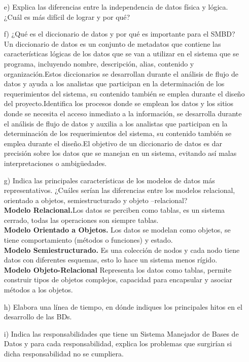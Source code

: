 \documentclass[a4paper, 12pt]{report}
\begin{document}
\begin{enumerate}
{\begin{enumerate}
\begin{itemize}
     \end{itemize}
    \item[e)]{Explica las diferencias entre la independencia de datos física y lógica. ¿Cuál es más difícil de lograr y por qué?  }
    \item[f)]{¿Qué es el diccionario de datos y por qué es importante para el SMBD?}\\
    Un diccionario de datos es un conjunto de metadatos que contiene las características lógicas de los datos que se van a utilizar en el sistema que se programa, incluyendo nombre, descripción, alias, contenido y organización.Estos diccionarios se desarrollan durante el análisis de flujo de datos y ayuda a los analistas que participan en la determinación de los requerimientos del sistema, su contenido también se emplea durante el diseño del proyecto.Identifica los procesos donde se emplean los datos y los sitios donde se necesita el acceso inmediato a la información, se desarrolla durante el análisis de flujo de datos y auxilia a los analistas que participan en la determinación de los requerimientos del sistema, su contenido también se emplea durante el diseño.El objetivo de un diccionario de datos es dar precisión sobre los datos que se manejan en un sistema, evitando así malas interpretaciones o ambigüedades.
    \item[g)]{Indica las principales características de los modelos de
    datos más representativos. ¿Cuáles serían las diferencias
    entre los  modelos relacional, orientado a objetos,
    semiestructurado y objeto –relacional?\\
    \textbf{Modelo Relacional.}Los datos se perciben como tablas,
    es un sistema cerrado, todas las operaciones son siempre tablas.\\
    \textbf{Modelo Orientado a Objetos.} Los datos se modelan como
    objetos, se tiene comportamiento (métodos o funciones) y estado.\\
    \textbf{Modelo Semiestructurado.} Es una colección de nodos y
    cada nodo tiene datos con diferentes esquemas, esto lo hace un
    sistema menos rígido.\\
    \textbf{Modelo Objeto-Relacional} Representa los datos como tablas,
    permite construir tipos de objetos complejos, capacidad para
    encapsular y asociar métodos a los objetos.}
    \item[h)]{Elabora una línea de tiempo, en dónde indiques los principales hitos en el desarrollo de las BDs.}
    \item[i)]{Indica las responsabilidades que tiene un Sistema Manejador de Bases de Datos y para cada responsabilidad, explica los problemas que surgirían si dicha responsabilidad no se cumpliera.}

\end{enumerate}}
\end{enumerate}
\end{document}
